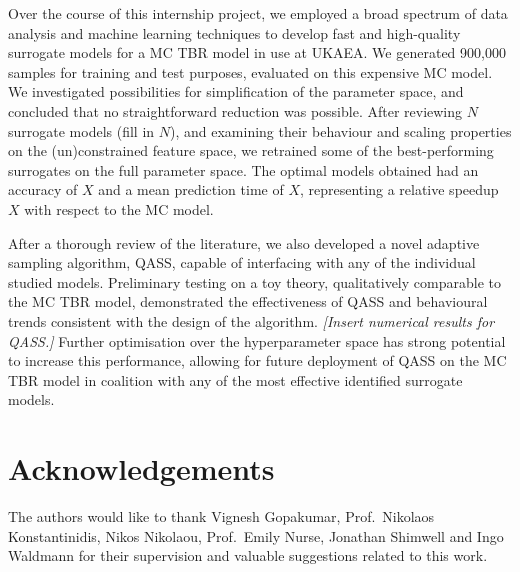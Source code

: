 Over the course of this internship project, we employed a broad spectrum of data analysis and machine learning techniques to develop fast and high-quality surrogate models for a MC TBR model in use at UKAEA. We generated 900,000 samples for training and test purposes, evaluated on this expensive MC model. We investigated possibilities for simplification of the parameter space, and concluded that no straightforward reduction was possible. After reviewing $N$ surrogate models (fill in $N$), and examining their behaviour and scaling properties on the (un)constrained feature space, we retrained some of the best-performing surrogates on the full parameter space. The optimal models obtained had an accuracy of $X$ and a mean prediction time of $X$, representing a relative speedup $X$ with respect to the MC model.

After a thorough review of the literature, we also developed a novel adaptive sampling algorithm, QASS, capable of interfacing with any of the individual studied models. Preliminary testing on a toy theory, qualitatively comparable to the MC TBR model, demonstrated the effectiveness of QASS and behavioural trends consistent with the design of the algorithm. \textit{[Insert numerical results for QASS.]} Further optimisation over the hyperparameter space has strong potential to increase this performance, allowing for future deployment of QASS on the MC TBR model in coalition with any of the most effective identified surrogate models.


\section*{Acknowledgements}

The authors would like to thank Vignesh Gopakumar, Prof.~Nikolaos
Konstantinidis, Nikos Nikolaou, Prof.~Emily Nurse, Jonathan Shimwell and Ingo
Waldmann for their supervision and valuable suggestions related to this work.

